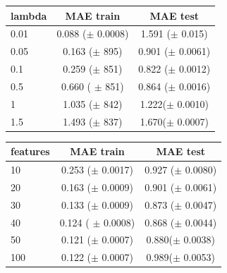 \begin{minipage}{\textwidth}
  \begin{minipage}[b]{0.45\textwidth}
\begin{center}
  \begin{tabular}{ |l | c | c| }
    \hline
     lambda & MAE train & MAE test \\ \hline
     0.01   & 0.088 ($\pm$  0.0008) &  1.591 ($\pm$ 0.015) \\ \hline
     0.05  &  0.163 ($\pm$  895) &  0.901 ($\pm$  0.0061) \\ \hline
     0.1     & 0.259 ($\pm$ 851)  & 0.822 ($\pm$ 0.0012) \\ \hline
     0.5    & 0.660  ( $\pm$ 851) & 0.864 ($\pm$  0.0016)\\ \hline
     1       & 1.035 ($\pm$ 842) & 1.222($\pm$  0.0010)\\ \hline
     1.5    & 1.493 ($\pm$ 837) & 1.670($\pm$  0.0007) \\
    \hline
  \end{tabular}
  	\label{table:labda_choice}
\end{center}
  \end{minipage}
  \hfill
  \begin{minipage}[b]{0.45\textwidth}
\begin{center}
  \begin{tabular}{ |l | c | c| }
    \hline
     features & MAE train & MAE test \\ \hline
     10   & 0.253 ($\pm$  0.0017) &  0.927 ($\pm$ 0.0080) \\ \hline
     20  &  0.163 ($\pm$  0.0009) &  0.901 ($\pm$  0.0061) \\ \hline
     30     & 0.133 ($\pm$ 0.0009)  & 0.873 ($\pm$ 0.0047) \\ \hline
     40    & 0.124  ( $\pm$ 0.0008) & 0.868 ($\pm$  0.0044)\\ \hline
     50       & 0.121 ($\pm$ 0.0007) & 0.880($\pm$  0.0038)\\ \hline
     100    & 0.122 ($\pm$ 0.0007) & 0.989($\pm$  0.0053) \\
    \hline
  \end{tabular}
  	\label{table:feature_choice}
\end{center}
    \end{minipage}
  \end{minipage}
  
